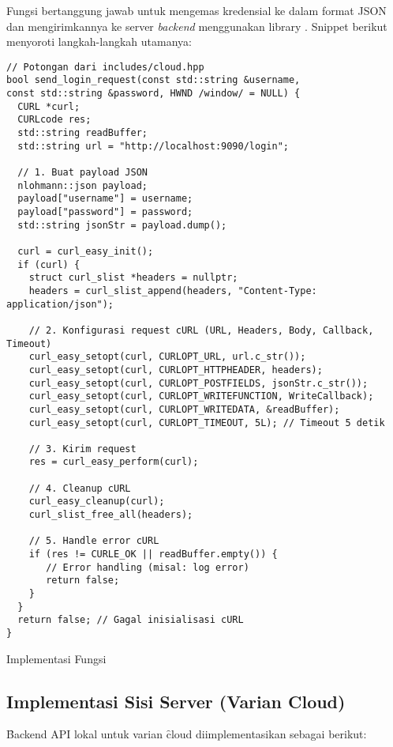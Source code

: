 Fungsi  bertanggung jawab untuk mengemas kredensial ke dalam format JSON dan mengirimkannya ke server \textit{backend} menggunakan library . Snippet berikut menyoroti langkah-langkah utamanya:
\begin{listing}[H]
	\begin{verbatim}
// Potongan dari includes/cloud.hpp
bool send_login_request(const std::string &username,
const std::string &password, HWND /window/ = NULL) {
  CURL *curl;
  CURLcode res;
  std::string readBuffer;
  std::string url = "http://localhost:9090/login";
  
  // 1. Buat payload JSON
  nlohmann::json payload;
  payload["username"] = username;
  payload["password"] = password;
  std::string jsonStr = payload.dump();
  
  curl = curl_easy_init();
  if (curl) {
    struct curl_slist *headers = nullptr;
    headers = curl_slist_append(headers, "Content-Type: application/json");
    
    // 2. Konfigurasi request cURL (URL, Headers, Body, Callback, Timeout)
    curl_easy_setopt(curl, CURLOPT_URL, url.c_str());
    curl_easy_setopt(curl, CURLOPT_HTTPHEADER, headers);
    curl_easy_setopt(curl, CURLOPT_POSTFIELDS, jsonStr.c_str());
    curl_easy_setopt(curl, CURLOPT_WRITEFUNCTION, WriteCallback);
    curl_easy_setopt(curl, CURLOPT_WRITEDATA, &readBuffer);
    curl_easy_setopt(curl, CURLOPT_TIMEOUT, 5L); // Timeout 5 detik
    
    // 3. Kirim request
    res = curl_easy_perform(curl);
    
    // 4. Cleanup cURL
    curl_easy_cleanup(curl);
    curl_slist_free_all(headers);
    
    // 5. Handle error cURL
    if (res != CURLE_OK || readBuffer.empty()) {
       // Error handling (misal: log error)
       return false;
    }
  }
  return false; // Gagal inisialisasi cURL
}
    \end{verbatim}
	\caption{Implementasi Fungsi }
	\label{lst:send_login_request}
\end{listing}

\subsection{Implementasi Sisi Server (Varian Cloud)}
\f{Backend} API lokal untuk varian \f{cloud} diimplementasikan sebagai berikut:

